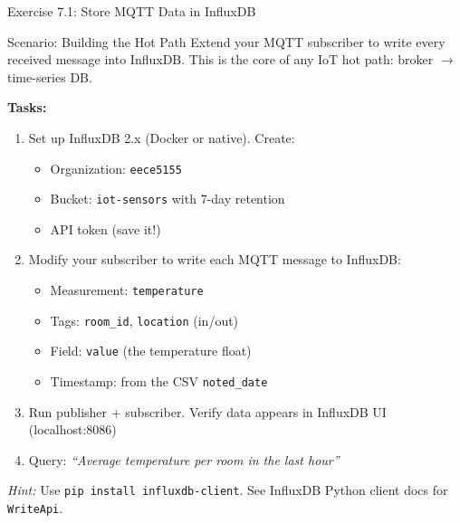 \documentclass[aspectratio=169,11pt]{beamer}
\begin{document}
\begin{frame}{Exercise 7.1: Store MQTT Data in InfluxDB}
    \begin{block}{Scenario: Building the Hot Path}
        Extend your MQTT subscriber to write every received message into InfluxDB. This is the core of any IoT hot path: broker $\rightarrow$ time-series DB.
    \end{block}

    \vspace{0.2cm}
    \textbf{Tasks:}
    \begin{enumerate}
        \item Set up InfluxDB 2.x (Docker or native). Create:
        \begin{itemize}
            \item Organization: \texttt{eece5155}
            \item Bucket: \texttt{iot-sensors} with 7-day retention
            \item API token (save it!)
        \end{itemize}
        \item Modify your subscriber to write each MQTT message to InfluxDB:
        \begin{itemize}
            \item Measurement: \texttt{temperature}
            \item Tags: \texttt{room\_id}, \texttt{location} (in/out)
            \item Field: \texttt{value} (the temperature float)
            \item Timestamp: from the CSV \texttt{noted\_date}
        \end{itemize}
        \item Run publisher + subscriber. Verify data appears in InfluxDB UI (localhost:8086)
        \item Query: \textit{``Average temperature per room in the last hour''}
    \end{enumerate}

    {\footnotesize \textit{Hint:} Use \texttt{pip install influxdb-client}. See InfluxDB Python client docs for \texttt{WriteApi}.}
\end{frame}
\end{document}
